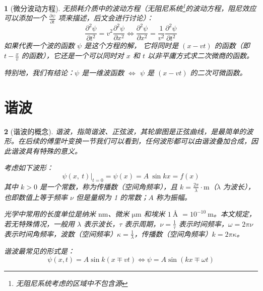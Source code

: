 \documentclass[UTF8]{report}
\theoremstyle{MyLineTheoremStyle} %
\theoremstyle{MyBlockTheoremStyle} %
\theoremstyle{MySubsubsectionStyle} %
\newtheorem{definition}{}
\begin{document}
\begin{definition}[微分波动方程]
无损耗介质中的波动方程（无阻尼系统\footnote{无阻尼系统考虑的区域中不包含源}的波动方程，阻尼效应可以添加一个 $\frac{\partial \psi }{\partial t }$ 项来描述，后文会进行讨论）：
\begin{equation}
    \frac{\partial^{2}\psi}{\partial t^{2}}  = v^2\frac{\partial^{2}\psi}{\partial x^{2}}\Longleftrightarrow \frac{\partial^{2}\psi}{\partial x^{2}}=\frac{1}{v^{2}}\frac{\partial^{2}\psi}{\partial t^{2}} 
\end{equation}
如果代表一个波的函数 $\psi$ 是这个方程的解， 它将同时是 $(x-vt)$ 的函数（即 $t - \frac{x}{v}$ 的函数），它还是一个可以同时对 $x$ 和 $t$ 以非平庸方式求二次微商的函数。\par
特别地，我们有结论：$\psi$ 是一维波函数 $\Longleftrightarrow$ $\psi$ 是 $(x-vt)$ 的二次可微函数。
\end{definition}

\section{谐波}

\begin{definition}[谐波的概念]
谐波，指简谐波、正弦波，其轮廓图是正弦曲线，是最简单的波形。在后续的傅里叶变换一节我们可以看到，任何波形都可以由谐波叠加合成，因此谐波具有特殊的意义。

考虑如下波形：
\begin{equation}
    \psi(x,\:t)\big|_{t=0}=\psi(x)=A\:\sin kx=f(x)
\end{equation}
其中 $k>0$ 是一个常数，称为传播数（空间角频率），且 $k = \frac{2\pi}{\lambda} \cdot \mathrm{m}$（$\lambda$ 为波长），也即数值上等于频率 $\nu$ 但是量纲为 1 的常数；$A$ 称为振幅。\par
光学中常用的长度单位是纳米 $\mathrm{nm}$、微米 $\mathrm{\mu m}$ 和埃米 $1\ \si{\angstrom}$ $ = 10^{-10}\ \mathrm{m}$。本文规定，若无特殊情况，一般用 $\lambda$ 表示波长，$\tau $ 表示周期，$\nu = \frac{1}{\tau}$ 表示时间频率，$\omega = 2\pi\nu$ 表示时间角频率，波数（空间频率）$\kappa = \frac{1}{\lambda}$，传播数（空间角频率）$k = 2\pi \kappa$。

谐波最常见的形式是：
\begin{equation}
    \psi(x,t)=A\sin k(x\mp vt) \Longleftrightarrow \psi=A\sin(kx\mp\omega t)
\end{equation}
\end{definition}
\end{document}
